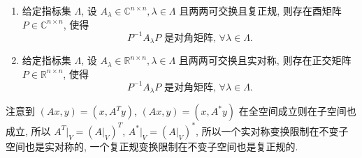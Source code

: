 \documentclass[../../main.tex]{subfiles}
\begin{document}
\begin{proposition}\label{proposition:一族两两可交换的复正规 (实对称) 矩阵可同时酉 (正交) 相似对角化}
\begin{enumerate}
\item 给定指标集 \(\Lambda\), 设 \(A_{\lambda} \in \mathbb{C}^{n \times n}, \lambda \in \Lambda\) 且两两可交换且复正规, 则存在酉矩阵 \(P \in \mathbb{C}^{n \times n}\), 使得
\[
P^{-1}A_{\lambda}P \text{ 是对角矩阵, } \forall \lambda \in \Lambda.
\]

\item 给定指标集 \(\Lambda\), 设 \(A_{\lambda} \in \mathbb{R}^{n \times n}, \lambda \in \Lambda\) 且两两可交换且实对称, 则存在正交矩阵 \(P \in \mathbb{R}^{n \times n}\), 使得
\[
P^{-1}A_{\lambda}P \text{ 是对角矩阵, } \forall \lambda \in \Lambda.
\]
\end{enumerate}
\end{proposition}
\begin{note}
注意到 \((Ax, y) = (x, A^T y)\), \((Ax, y) = (x, A^* y)\) 在全空间成立则在子空间也成立, 所以 \(A^T|_V = (A|_V)^T\), \(A^*|_V = (A|_V)^*\), 所以一个实对称变换限制在不变子空间也是实对称的, 一个复正规变换限制在不变子空间也是复正规的.
\end{note}
\end{document}
